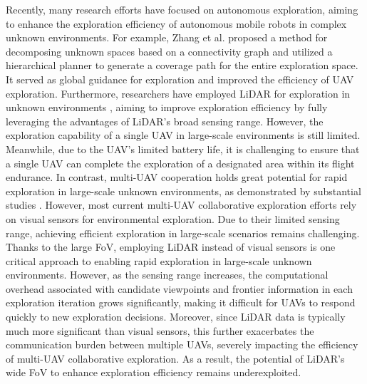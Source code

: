 \documentclass[letterpaper, 10pt, journal, twoside]{support/IEEEtran}
\begin{document}
Recently, many research efforts have focused on autonomous exploration, aiming to enhance the exploration efficiency of autonomous mobile robots in complex unknown environments. 
For example, Zhang et al. \cite{zhang2024falcon} proposed a method for decomposing unknown spaces based on a connectivity graph and utilized a hierarchical planner to generate a coverage path for the entire exploration space. It served as global guidance for exploration and improved the efficiency of UAV exploration. 
Furthermore, researchers have employed LiDAR for exploration in unknown environments \cite{tang2023bubble, lindqvist2024tree},  aiming to improve exploration efficiency by fully leveraging the advantages of LiDAR's broad sensing range. 
However, the exploration capability of a single UAV in large-scale environments is still limited. Meanwhile, due to the UAV's limited battery life, it is challenging to ensure that a single UAV can complete the exploration of a designated area within its flight endurance.
In contrast, multi-UAV cooperation holds great potential for rapid exploration in large-scale unknown environments, as demonstrated by substantial studies \cite{cao2023representation, zhou2023racer, bartolomei2023fast, dong2024fast}. However, most current multi-UAV collaborative exploration efforts rely on visual sensors for environmental exploration. Due to their limited sensing range, achieving efficient exploration in large-scale scenarios remains challenging.
Thanks to the large FoV, employing LiDAR instead of visual sensors is one critical approach to enabling rapid exploration in large-scale unknown environments. However, as the sensing range increases, the computational overhead associated with candidate viewpoints and frontier information in each exploration iteration grows significantly, making it difficult for UAVs to respond quickly to new exploration decisions. Moreover, since LiDAR data is typically much more significant than visual sensors, this further exacerbates the communication burden between multiple UAVs, severely impacting the efficiency of multi-UAV collaborative exploration. As a result, the potential of LiDAR's wide FoV to enhance exploration efficiency remains underexploited.
\end{document}

